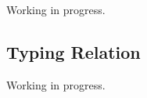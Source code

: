 \documentclass{report}
\newcommand{\code}{\mathtt}
\newcommand{\ruleTag}[1]{\label{#1}\tag{\textsc{#1}}}
\DeclareMathOperator{\instantiate}{inst}
\DeclareMathOperator{\freeVariable}{fv}
\DeclareMathOperator{\mostGeneralUnifier}{mgu}
\newcommand{\newVariable}{newvar}
\newcommand{\entails}{\vdash}
\newcommand{\typingRelation}[4]{#1 \entails #2 \;:\; #3 ,\; #4}
\newcommand{\composite}{\circ}
\begin{document}
Working in progress.


\subsection{Typing Relation}

Working in progress.

\end{document}
